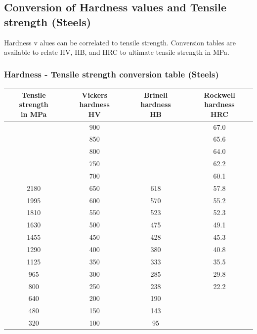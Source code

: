 \documentclass{article}
\begin{document}
\newpage
\subsection{Conversion of Hardness values and Tensile strength (Steels)}
Hardness v alues can be correlated to tensile strength. Conversion tables are available to
relate HV, HB, and HRC to ultimate tensile strength in MPa.

\subsubsection{Hardness - Tensile strength conversion table (Steels)}
\begin{table}[h!]
  \centering
  \begin{tabular}{|c|c|c|c|}
    \hline
    \makecell{\textbf{Tensile strength}\\\textbf{in MPa}} &
    \makecell{\textbf{Vickers hardness}\\\textbf{HV}} &
    \makecell{\textbf{Brinell hardness}\\\textbf{HB}} &
    \makecell{\textbf{Rockwell hardness}\\\textbf{HRC}} \\
    \hline
     & 900 & & 67.0 \\
    \hline
     & 850 & & 65.6 \\
    \hline
     & 800 & & 64.0 \\
    \hline
     & 750 & & 62.2 \\
    \hline
     & 700 & & 60.1 \\
    \hline
    2180 & 650 & 618 & 57.8 \\
    \hline
    1995 & 600 & 570 & 55.2 \\
    \hline
    1810 & 550 & 523 & 52.3 \\
    \hline
    1630 & 500 & 475 & 49.1 \\
    \hline
    1455 & 450 & 428 & 45.3 \\
    \hline
    1290 & 400 & 380 & 40.8 \\
    \hline
    1125 & 350 & 333 & 35.5 \\
    \hline
    965 & 300 & 285 & 29.8 \\
    \hline
    800 & 250 & 238 & 22.2 \\
    \hline
    640 & 200 & 190 & \\
    \hline
    480 & 150 & 143 & \\
    \hline
    320 & 100 & 95 & \\
    \hline
  \end{tabular}
\end{table}
\end{document}
